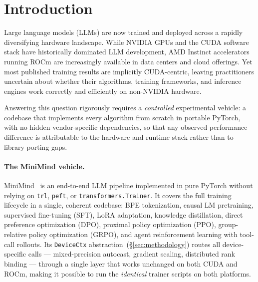 \section{Introduction}
\label{sec:intro}

Large language models (LLMs) are now trained and deployed across a rapidly
diversifying hardware landscape.  While NVIDIA GPUs and the CUDA software stack
have historically dominated LLM development, AMD Instinct accelerators running
ROCm are increasingly available in data centers and cloud offerings.  Yet most
published training results are implicitly CUDA-centric, leaving practitioners
uncertain about whether their algorithms, training frameworks, and inference
engines work correctly and efficiently on non-NVIDIA hardware.

Answering this question rigorously requires a \emph{controlled} experimental
vehicle: a codebase that implements every algorithm from scratch in portable
PyTorch, with no hidden vendor-specific dependencies, so that any observed
performance difference is attributable to the hardware and runtime stack rather
than to library porting gaps.

\paragraph{The MiniMind vehicle.}
MiniMind~\citep{minimind2024} is an end-to-end LLM pipeline implemented in pure
PyTorch without relying on \texttt{trl}, \texttt{peft}, or
\texttt{transformers.Trainer}.  It covers the full training lifecycle in a
single, coherent codebase: BPE tokenization, causal LM pretraining, supervised
fine-tuning (SFT), LoRA adaptation, knowledge distillation, direct preference
optimization (DPO), proximal policy optimization (PPO), group-relative policy
optimization (GRPO), and agent reinforcement learning with tool-call rollouts.
Its \texttt{DeviceCtx} abstraction~(\S\ref{sec:methodology}) routes all
device-specific calls — mixed-precision autocast, gradient scaling, distributed
rank binding — through a single layer that works unchanged on both CUDA and ROCm,
making it possible to run the \emph{identical} trainer scripts on both platforms.

